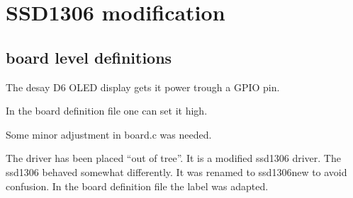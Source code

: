 \documentclass[letterpaper,10pt,english]{sphinxmanual}
\begin{document}


\section{SSD1306 modification}
\label{\detokenize{drivers/ssd1306:ssd1306-modification}}\label{\detokenize{drivers/ssd1306::doc}}

\subsection{board level definitions}
\label{\detokenize{drivers/ssd1306:board-level-definitions}}
The desay D6 OLED display gets it power trough a GPIO pin.

In the board definition file one can set it high.

Some minor adjustment in board.c was needed.

\begin{sphinxVerbatim}[commandchars=\\\{\}]
     
 
 



  
          
          
          
            
\end{sphinxVerbatim}

The driver has been placed “out of tree”.
It is a modified ssd1306 driver.
The ssd1306 behaved somewhat differently.
It was renamed to ssd1306new to avoid confusion.
In the board definition file the label was adapted.
\end{document}
